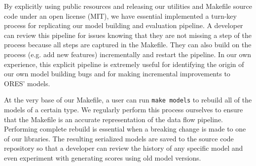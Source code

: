 By explicitly using public resources and releasing our utilities and Makefile source code under an open license (MIT), we have essential implemented a turn-key process for replicating our model building and evaluation pipeline.  A developer can review this pipeline for issues knowing that they are not missing a step of the process because all steps are captured in the Makefile.  They can also build on the process (e.g. add new features) incrementally and restart the pipeline.  In our own experience, this explicit pipeline is extremely useful for identifying the origin of our own model building bugs and for making incremental improvements to ORES' models.

At the very base of our Makefile, a user can run \texttt{make models} to rebuild all of the models of a certain type.  We regularly perform this process ourselves to ensure that the Makefile is an accurate representation of the data flow pipeline.  Performing complete rebuild is essential when a breaking change is made to one of our libraries.  The resulting serialized models are saved to the source code repository so that a developer can review the history of any specific model and even experiment with generating scores using old model versions.
